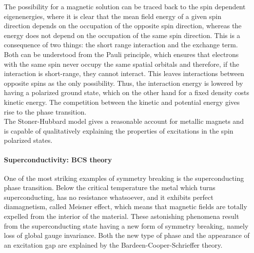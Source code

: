 \documentclass{homework}
\begin{document}
The possibility for a magnetic solution can be traced back to the spin dependent eigenenergies, where it is clear that the mean field energy of a given spin direction depends on the occupation of the opposite spin direction, whereas the energy does not depend on the occupation of the same spin direction. This is a consequence of two things: the short range interaction and the exchange term. Both can be understood from the Pauli principle, which ensures that electrons with the same spin never occupy the same spatial orbitals and therefore, if the interaction is short-range, they cannot interact. This leaves interactions between opposite spins as the only possibility. Thus, the interaction energy is lowered by having a polarized ground state, which on the other hand for a fixed density costs kinetic energy. The competition between the kinetic and potential energy gives rise to the phase transition. \\

The Stoner-Hubbard model gives a reasonable account for metallic magnets and is capable of qualitatively explaining the properties of excitations in the spin polarized states. \\


\paragraph{\textbf{Superconductivity: BCS theory}}

One of the most striking examples of symmetry breaking is the superconducting phase transition. Below the critical temperature the metal which turns superconducting, has no resistance whatsoever, and it exhibits perfect diamagnetism, called Meisner effect, which means that magnetic fields are totally expelled from the interior of the material. These astonishing phenomena result from the superconducting state having a new form of symmetry breaking, namely loss of global gauge invariance. Both the new type of phase and the appearance of an excitation gap are explained by the Bardeen-Cooper-Schrieffer theory. \\
\end{document}
